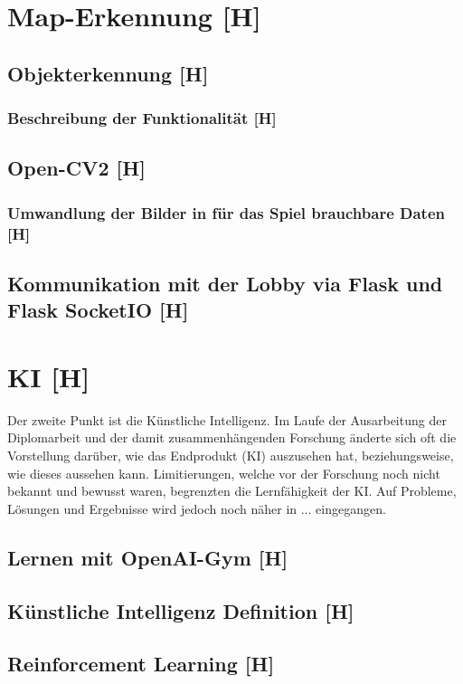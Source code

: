 

\section{Map-Erkennung [H]}
\subsection{Objekterkennung [H]}
\subsubsection{Beschreibung der Funktionalität [H]}
\subsection{Open-CV2 [H]}
\subsubsection{Umwandlung der Bilder in für das Spiel brauchbare Daten [H]}
\subsection{Kommunikation mit der Lobby via Flask und Flask SocketIO [H]}

\section{KI [H]}
Der zweite Punkt ist die Künstliche Intelligenz. 
Im Laufe der Ausarbeitung der Diplomarbeit und der damit zusammenhängenden Forschung änderte sich oft die
Vorstellung darüber, wie das Endprodukt (KI) auszusehen hat, beziehungsweise, wie dieses aussehen kann. 
Limitierungen, welche vor der Forschung noch nicht bekannt und bewusst waren, begrenzten die Lernfähigkeit der KI.
Auf Probleme, Lösungen und Ergebnisse wird jedoch noch näher in ... eingegangen.
\subsection{Lernen mit OpenAI-Gym [H]}
\subsection{Künstliche Intelligenz Definition [H]}
\subsection{Reinforcement Learning [H]}
